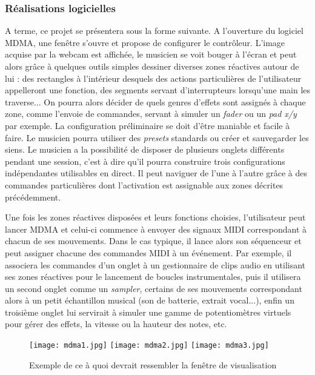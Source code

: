 \subsubsection*{Réalisations logicielles}

\par A terme, ce projet se présentera sous la forme suivante.
A l'ouverture du logiciel MDMA, une fenêtre s'ouvre et propose de configurer le contrôleur. L'image acquise par la webcam est affichée, le musicien se voit bouger à l'écran et peut alors grâce à quelques outils simples dessiner diverses zones réactives autour de lui : des rectangles à l'intérieur desquels des actions particulières de l'utilisateur appelleront une fonction, des segments servant d'interrupteurs lorsqu'une main les traverse... On pourra alors décider de quels genres d'effets sont assignés à chaque zone, comme l'envoie de commandes, servant à simuler un \emph{fader} ou un \emph{pad x/y} par exemple. La configuration préliminaire se doit d'être maniable et facile à faire. Le musicien pourra utiliser des \emph{presets} standards ou créer et sauvegarder les siens. Le musicien a la possibilité de disposer de plusieurs onglets différents pendant une session, c'est à dire qu'il pourra construire trois configurations indépendantes utilisables en direct. Il peut naviguer de l'une à l'autre grâce à des commandes particulières dont l'activation est assignable aux zones décrites précédemment.

\par Une fois les zones réactives disposées et leurs fonctions choisies, l'utilisateur peut lancer MDMA et celui-ci commence à envoyer des signaux MIDI correspondant à chacun de ses mouvements. Dans le cas typique, il lance alors son séquenceur et peut assigner chacune des commandes MIDI à un événement. Par exemple, il associera les commandes d'un onglet à un gestionnaire de clips audio en utilisant ses zones réactives pour le lancement de boucles instrumentales, puis il utilisera un second onglet comme un \emph{sampler}, certains de ses mouvements correspondant alors à un petit échantillon musical (son de batterie, extrait vocal...), enfin un troisième onglet lui servirait à simuler une gamme de potentiomètres virtuels pour gérer des effets, la vitesse ou la hauteur des notes, etc.

\begin{figure}
	\begin{center}
		\texttt{[image: mdma1.jpg]}
		\texttt{[image: mdma2.jpg]}
		\texttt{[image: mdma3.jpg]}
	\end{center}
	\caption{Exemple de ce à quoi devrait ressembler la fenêtre de visualisation}
\end{figure}

